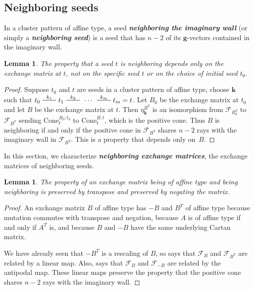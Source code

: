 \documentclass{amsart}
\newtheorem{lemma}[proposition]{Lemma}
\theoremstyle{definition}
\theoremstyle{remark}
\numberwithin{equation}{section}
\newcommand{\newword}[1]{\textbf{\emph{#1}}}
\newcommand{\edge}{\,\,\rule[2.7pt]{20pt}{0.5pt}\,\,}
\newcommand{\F}{{\mathcal F}}
\newcommand{\0}{{\mathbf{0}}}
\newcommand{\Cone}{\mathrm{Cone}}
\newcommand{\g}{\mathbf{g}}
\newcommand{\kk}{\mathbf{k}}
\begin{document}
\subsection{Neighboring seeds}
In a cluster pattern of affine type, a seed \newword{neighboring the imaginary wall} (or simply a \newword{neighboring seed}) is a seed that has $n-2$ of its $\g$-vectors contained in the imaginary wall.

\begin{lemma}\label{neigh B only}
The property that a seed $t$ is neighboring depends only on the exchange matrix at $t$, not on the specific seed $t$ or on the choice of initial seed $t_0$.
\end{lemma}
\begin{proof}
Suppose $t_0$ and $t$ are seeds in a cluster pattern of affine type, choose $\kk$ such that $t_0\overset{k_1}{\edge}t_1\overset{k_2}{\edge}\,\cdots\,\overset{k_m}{\edge}t_m=t$.
Let $B_0$ be the exchange matrix at $t_0$ and let $B$ be the exchange matrix at $t$.
Then $\eta^{B^T}_\kk$ is an isomorphism from $\F_{B_0^T}$ to $\F_{B^T}$ sending $\Cone_t^{B_0;t_0}$ to $\Cone_t^{B;t}$, which is the positive cone.
Thus $B$ is neighboring if and only if the positive cone in $\F_{B^T}$ shares $n-2$ rays with the imaginary wall in $\F_{B^T}$.
This is a property that depends only on~$B$.
\end{proof}

In this section, we characterize \newword{neighboring exchange matrices}, the exchange matrices of neighboring seeds.

\begin{lemma}\label{neigh neg and T}
The property of an exchange matrix being of affine type and being neighboring is preserved by transpose and preserved by negating the matrix.
\end{lemma}
\begin{proof}
An exchange matrix $B$ of affine type has $-B$ and $B^T$ of affine type because mutation commutes with transpose and negation, because $A$ is of affine type if and only if $A^T$ is, and because $B$ and $-B$ have the same underlying Cartan matrix.

We have already seen that $-B^T$ is a rescaling of $B$, so \cite[Proposition~7.8(3)]{universal} says that $\F_B$ and $\F_{B^T}$ are related by a linear map.
Also, \cite[Proposition~7.1]{universal} says that $\F_B$ and $\F_{-B}$ are related by the antipodal map.
These linear maps preserve the property that the positive cone shares $n-2$ rays with the imaginary wall.
\end{proof}
\end{document}
